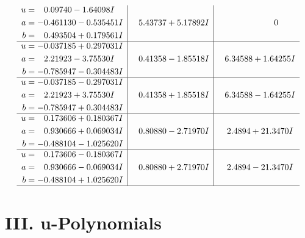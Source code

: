 \documentclass[1p]{elsarticle_modified}
\theoremstyle{definition}
\begin{document}
$$\begin{array}{c|c|c}
\begin{aligned}
u &= \phantom{-}0.09740 - 1.64098 I \\
a &= -0.461130 - 0.535451 I \\
b &= \phantom{-}0.493504 + 0.179561 I\end{aligned}
 & \phantom{-}5.43737 + 5.17892 I & \phantom{-0.000000 } 0 \\ \hline\begin{aligned}
u &= -0.037185 + 0.297031 I \\
a &= \phantom{-}2.21923 - 3.75530 I \\
b &= -0.785947 - 0.304483 I\end{aligned}
 & \phantom{-}0.41358 - 1.85518 I & \phantom{-}6.34588 + 1.64255 I \\ \hline\begin{aligned}
u &= -0.037185 - 0.297031 I \\
a &= \phantom{-}2.21923 + 3.75530 I \\
b &= -0.785947 + 0.304483 I\end{aligned}
 & \phantom{-}0.41358 + 1.85518 I & \phantom{-}6.34588 - 1.64255 I \\ \hline\begin{aligned}
u &= \phantom{-}0.173606 + 0.180367 I \\
a &= \phantom{-}0.930666 + 0.069034 I \\
b &= -0.488104 - 1.025620 I\end{aligned}
 & \phantom{-}0.80880 - 2.71970 I & \phantom{-}2.4894 + 21.3470 I \\ \hline\begin{aligned}
u &= \phantom{-}0.173606 - 0.180367 I \\
a &= \phantom{-}0.930666 - 0.069034 I \\
b &= -0.488104 + 1.025620 I\end{aligned}
 & \phantom{-}0.80880 + 2.71970 I & \phantom{-}2.4894 - 21.3470 I\\
 \hline 
 \end{array}$$\newpage
\newpage\renewcommand{\arraystretch}{1}
\centering \section*{ III. u-Polynomials}
\end{document}
